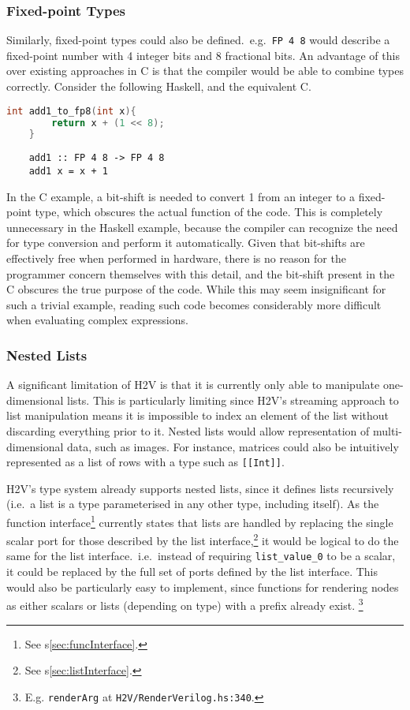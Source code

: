 \documentclass[english,onecolumn]{scrartcl}
\begin{document}
\subsubsection{Fixed-point Types}
Similarly, fixed-point types could also be defined.\ e.g.\ \texttt{FP 4 8} would describe a fixed-point number with 4 integer bits
and 8 fractional bits. An advantage of this over existing approaches in C is that the compiler would be able to combine types
correctly. Consider the following Haskell, and the equivalent C.

\begin{lstlisting}[language=C]
    int add1_to_fp8(int x){
        return x + (1 << 8);
    }
\end{lstlisting}

\begin{lstlisting}
    add1 :: FP 4 8 -> FP 4 8
    add1 x = x + 1
\end{lstlisting}

In the C example, a bit-shift is needed to convert 1 from an integer to a fixed-point type, which obscures the actual function of
the code. This is completely unnecessary in the Haskell example, because the compiler can recognize the need for type conversion
and perform it automatically. Given that bit-shifts are effectively free when performed in hardware, there is no reason for the
programmer concern themselves with this detail, and the bit-shift present in the C obscures the true purpose of the code. While
this may seem insignificant for such a trivial example, reading such code becomes considerably more difficult when evaluating
complex expressions.


\subsubsection{Nested Lists}
A significant limitation of H2V is that it is currently only able to manipulate one-dimensional lists. This is particularly
limiting since H2V's streaming approach to list manipulation means it is impossible to index an element of the list without
discarding everything prior to it. Nested lists would allow representation of multi-dimensional data, such as images.
For instance, matrices could also be intuitively represented as a list of rows with a type such as \texttt{[[Int]]}.

H2V's type system already supports nested lists, since it defines lists recursively (i.e.\ a list is a type parameterised in any
other type, including itself). As the function interface\footnote{See s\ref{sec:funcInterface}.} currently states that lists are
handled by replacing the single scalar port for those described by the list interface,\footnote{See s\ref{sec:listInterface}.}
it would be logical to do the same for the list interface.\ i.e.\ instead of requiring \texttt{list\_value\_0} to be a scalar, it
could be replaced by the full set of ports defined by the list interface. This would also be particularly easy to implement, since
functions for rendering nodes as either scalars or lists (depending on type) with a prefix already exist.%
\footnote{E.g. \texttt{renderArg} at \texttt{H2V/RenderVerilog.hs:340}.}
\end{document}
